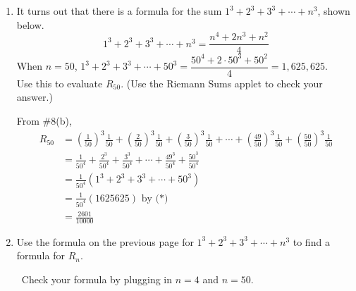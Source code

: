 \documentclass{article}
\begin{document}
\begin{enumerate}
\begin{enumerate}
  \item
    \begin{problem}[\nstretch{3}]
      It turns out that there is a formula for the sum $1^3+2^3+3^3+\cdots+n^3$, shown below.
      \begin{equation*}
        1^3 + 2^3 + 3^3 + \cdots + n^3 = \dfrac{n^4 + 2n^3 +
          n^2}{4}
      \end{equation*}
      When $n = 50$, $1^3 + 2^3 + 3^3 + \cdots + 50^3 =
      \dfrac{50^4 + 2 \cdot 50^3 + 50^2}{4} = 1,625,625$.  \\ Use this to
      evaluate $R_{50}$.  (Use the Riemann Sums applet to check your
      answer.)
    \end{problem}

    \begin{solution}
      From {{{{\#8}}(b)}}, 
      \begin{align*}
        R_{50} & = \left( \frac{1}{50} \right)^3 \frac{1}{50} + \left(
          \frac{2}{50} \right)^3 \frac{1}{50} + \left( \frac{3}{50}
        \right)^3 \frac{1}{50} + \cdots + \left( \frac{49}{50} \right)^3
        \frac{1}{50} + \left( \frac{50}{50} \right)^3 \frac{1}{50}\\
        &= \frac{1}{50^4} + \frac{2^3}{50^4} + \frac{3^3}{50^4} + \cdots +
        \frac{49^3}{50^4} + \frac{50^3}{50^4} \\
        & = \frac{1}{50^4}\left(1^3 + 2^3 + 3^3 + \cdots + 50^3  \right) \\
        & = \frac{1}{50^4}(1625625) \text{ by (*)} \\
        & = \boxed{\frac{2601}{10000}}
      \end{align*}
    \end{solution}

  \item
    \begin{problem}[\stretch{2.5}]
      Use the formula on the previous page for $1^3+2^3+3^3+\cdots+n^3$ to find a  formula for $R_n$.

      \checkmark\ Check your formula by plugging in $n = 4$ and $n = 50$.
    \end{problem}


\end{enumerate}
\end{enumerate}
\end{document}
